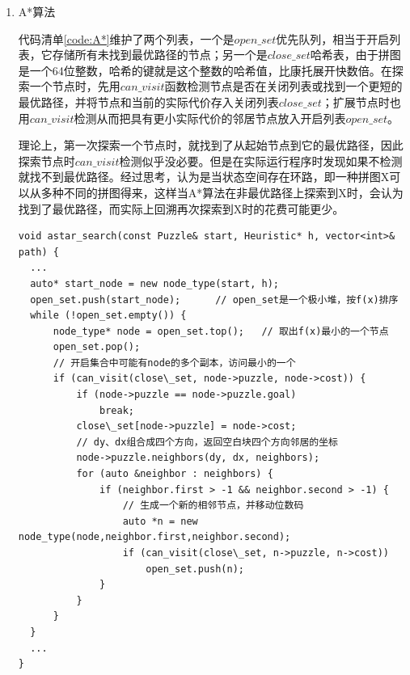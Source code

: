 \documentclass[10pt,letterpaper]{ctexart}
\begin{document}
\begin{enumerate}[itemindent=2.5em,label=\arabic*、]
\item A*算法
\par \qquad 代码清单\ref{code:A*}维护了两个列表，一个是$open\_set$优先队列，相当于开启列表，它存储所有未找到最优路径的节点；另一个是{\color{red}$close\_set$哈希表，由于拼图是一个64位整数，哈希的键就是这个整数的哈希值，比康托展开快数倍}。在探索一个节点时，先用$can\_visit$函数检测节点是否在关闭列表或找到一个更短的最优路径，并将节点和当前的实际代价存入关闭列表$close\_set$；扩展节点时也用$can\_visit$检测从而把具有更小实际代价的邻居节点放入开启列表$open\_set$。
\par \qquad 理论上，第一次探索一个节点时，就找到了从起始节点到它的最优路径，因此探索节点时$can\_visit$检测似乎没必要。但是在实际运行程序时发现如果不检测就找不到最优路径。经过思考，认为是当状态空间存在环路，即一种拼图X可以从多种不同的拼图得来，这样当A*算法在非最优路径上探索到X时，会认为找到了最优路径，而实际上回溯再次探索到X时的花费可能更少。
\begin{lstlisting}[caption=A*,label={code:A*},captionpos=b]
void astar_search(const Puzzle& start, Heuristic* h, vector<int>& path) {
  ...
  auto* start_node = new node_type(start, h);
  open_set.push(start_node);      // open_set是一个极小堆，按f(x)排序
  while (!open_set.empty()) {
      node_type* node = open_set.top();   // 取出f(x)最小的一个节点
      open_set.pop();
      // 开启集合中可能有node的多个副本，访问最小的一个
      if (can_visit(close\_set, node->puzzle, node->cost)) {
          if (node->puzzle == node->puzzle.goal)
              break;
          close\_set[node->puzzle] = node->cost;
          // dy、dx组合成四个方向，返回空白块四个方向邻居的坐标
          node->puzzle.neighbors(dy, dx, neighbors);
          for (auto &neighbor : neighbors) {
              if (neighbor.first > -1 && neighbor.second > -1) {
                  // 生成一个新的相邻节点，并移动位数码
                  auto *n = new node_type(node,neighbor.first,neighbor.second);
                  if (can_visit(close\_set, n->puzzle, n->cost))
                      open_set.push(n);
              }
          }
      }
  }
  ...
}
\end{lstlisting}


\end{enumerate}
\end{document}

